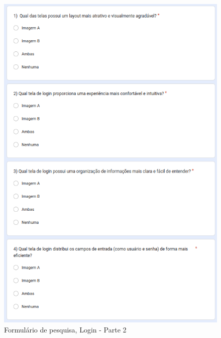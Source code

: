 \newpage

\begin{figure}[!h]
	\begin{center}
	    \includegraphics[scale=0.6]{figs/Form/06.png}
	\end{center}
	\caption{\label{AP_LP02}Formulário de pesquisa, Login - Parte 2}
\end{figure}

\newpage

